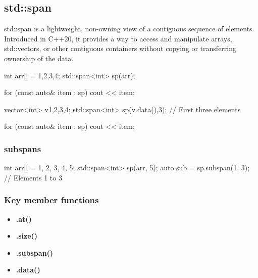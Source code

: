 \documentclass{report}
\begin{document}
         \subsection{std::span}
         \bigbreak \noindent 
         std::span is a lightweight, non-owning view of a contiguous sequence of elements. Introduced in C++20, it provides a way to access and manipulate arrays, std::vectors, or other contiguous containers without copying or transferring ownership of the data.
         \bigbreak \noindent 
         \begin{cppcode}
             int arr[] = {1,2,3,4};
             std::span<int> sp(arr);

             for (const auto& item : sp) cout << item;

             vector<int> v{1,2,3,4};
             std::span<int> sp(v.data(),3); // First three elements

             for (const auto& item : sp) cout << item;
         \end{cppcode}

         \bigbreak \noindent 
         \subsubsection{subspans}
         \bigbreak \noindent 
         \begin{cppcode}
             int arr[] = {1, 2, 3, 4, 5};
             std::span<int> sp(arr, 5);
             auto sub = sp.subspan(1, 3); // Elements 1 to 3
         \end{cppcode}
         \bigbreak \noindent 
         \subsubsection{Key member functions}
         \begin{itemize}
             \item \textbf{.at()}
             \item \textbf{.size()}
             \item \textbf{.subspan()}
             \item \textbf{.data()}
         \end{itemize}
\end{document}
